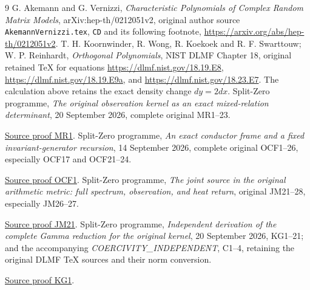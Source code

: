 \begin{thebibliography}{9}
 G. Akemann and G. Vernizzi,
\emph{Characteristic Polynomials of Complex Random Matrix Models},
arXiv:hep-th/0212051v2, original author source
\texttt{AkemannVernizzi.tex}, \texttt{CD} and its following footnote,
\url{https://arxiv.org/abs/hep-th/0212051v2}.
 T. H. Koornwinder, R. Wong, R. Koekoek and R. F. Swarttouw;
W. P. Reinhardt, \emph{Orthogonal Polynomials}, NIST DLMF Chapter 18,
original retained TeX for equations
\url{https://dlmf.nist.gov/18.19.E8},
\url{https://dlmf.nist.gov/18.19.E9a}, and
\url{https://dlmf.nist.gov/18.23.E7}.
The calculation above retains the exact density change \(dy=2dx\).
 Split-Zero programme,
\emph{The original observation kernel as an exact mixed-relation
determinant}, 20 September 2026, complete original MR1--23.

\href{https://github.com/KokunoYumeto/zeta-function-research-reader/blob/5992ad50c0f2a06921f1fcaded7b4e38097c0739/workbenches/splitzero-tandem/continuations/20260920-original-kernel-mixed-determinants/ORIGINAL_KERNEL_MIXED_DETERMINANT.tex\#L36}{Source proof MR1}.
 Split-Zero programme,
\emph{An exact conductor frame and a fixed invariant-generator
recursion}, 14 September 2026, complete original OCF1--26,
especially OCF17 and OCF21--24.

\href{https://github.com/KokunoYumeto/zeta-function-research-reader/blob/5992ad50c0f2a06921f1fcaded7b4e38097c0739/workbenches/splitzero-tandem/continuations/20260920-original-kernel-mixed-determinants/providers/ORIGINAL_CONDUCTOR_STRIP_FRAME.tex\#L27}{Source proof OCF1}.
 Split-Zero programme,
\emph{The joint source in the original arithmetic metric: full
spectrum, observation, and heat return}, original JM21--28,
especially JM26--27.

\href{https://github.com/KokunoYumeto/zeta-function-research-reader/blob/5992ad50c0f2a06921f1fcaded7b4e38097c0739/workbenches/splitzero-tandem/continuations/20260920-original-kernel-mixed-determinants/providers/JOINT_MINIMUM_RECEIVERS.tex\#L286}{Source proof JM21}.
 Split-Zero programme,
\emph{Independent derivation of the complete Gamma reduction for the
original kernel}, 20 September 2026, KG1--21; and the accompanying
\emph{COERCIVITY\_INDEPENDENT}, C1--4, retaining the original DLMF
TeX sources and their norm conversion.

\href{https://github.com/KokunoYumeto/zeta-function-research-reader/blob/5992ad50c0f2a06921f1fcaded7b4e38097c0739/workbenches/splitzero-tandem/continuations/20260920-original-kernel-mixed-determinants/providers/KERNEL_GAMMA_INDEPENDENT.tex\#L73}{Source proof KG1}.
\end{thebibliography}

